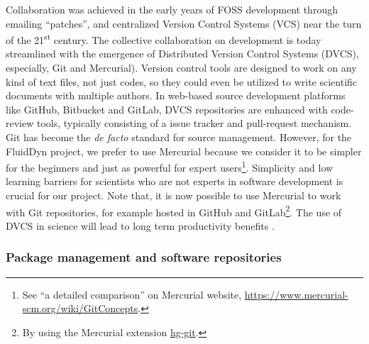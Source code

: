 Collaboration was achieved in the early years of FOSS development through
emailing ``patches'', and centralized Version Control Systems (VCS) near the
turn of the 21\textsuperscript{st} century.  The collective collaboration on
development is today streamlined with the emergence of Distributed Version
Control Systems (DVCS), especially, Git and Mercurial).
%
Version control tools are designed to work on any kind of text files, not just
codes, so they could even be utilized to write scientific documents with
multiple authors.
%
In web-based source development platforms like GitHub, Bitbucket and GitLab,
DVCS repositories are enhanced with code-review tools, typically consisting of
a issue tracker and pull-request mechanism.
%
Git has become the \textit{de facto} standard for source management. However,
for the FluidDyn project, we prefer to use Mercurial because we consider it to
be simpler for the beginners and just as powerful for expert users\footnote{See
  {``a detailed comparison''} on Mercurial website,
  \url{https://www.mercurial-scm.org/wiki/GitConcepts}.
  }. Simplicity and low learning barriers for
scientists who are not experts in software development is crucial for our
project.
%
Note that, it is now possible to use Mercurial to work with Git repositories,
for example hosted in GitHub and GitLab\footnote{By using the Mercurial
extension \href{http://hg-git.github.io/}{hg-git}.}.
%
The use of DVCS in science will lead to long term productivity benefits
\citep{wilson_best_2014}.


\subsubsection{Package management and software repositories}


